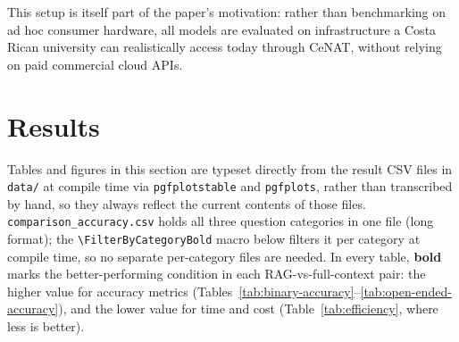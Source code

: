 \documentclass[conference]{IEEEtran}
\begin{document}
This setup is itself part of the paper's motivation: rather than benchmarking on ad hoc consumer hardware, all models are evaluated on infrastructure a Costa Rican university can realistically access today through CeNAT, without relying on paid commercial cloud APIs.

\section{Results}

Tables and figures in this section are typeset directly from the result CSV files in \texttt{data/} at compile time via \texttt{pgfplotstable} and \texttt{pgfplots}, rather than transcribed by hand, so they always reflect the current contents of those files.
\texttt{comparison\_accuracy.csv} holds all three question categories in one file (long format); the \texttt{\textbackslash FilterByCategoryBold} macro below filters it per category at compile time, so no separate per-category files are needed.
In every table, \textbf{bold} marks the better-performing condition in each RAG-vs-full-context pair: the higher value for accuracy metrics (Tables~\ref{tab:binary-accuracy}--\ref{tab:open-ended-accuracy}), and the lower value for time and cost (Table~\ref{tab:efficiency}, where less is better).

\accuracytable
{}\efficiencytable

\makeatletter
\protected{}
\end{document}
